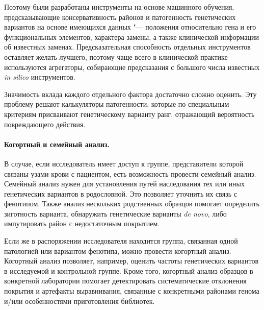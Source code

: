 \documentclass[a4paper,12pt]{article}
\begin{document}
\begin{enumerate}
Поэтому были разработаны инструменты на основе машинного обучения, предсказывающие консервативность районов и патогенность генетических вариантов на основе имеющихся данных "--- положения относительно гена и его функциональных элементов, характера замены, а также клинической информации об известных заменах\cite{j_Brea_Fernandez_2011}.
Предсказательная способность отдельных инструментов оставляет желать лучшего, поэтому чаще всего в клинической практике используются агрегаторы, собирающие предсказания с большого числа известных \textit{in silico} инструментов.
\end{enumerate}

Значимость вклада каждого отдельного фактора достаточно сложно оценить.
Эту проблему решают калькуляторы патогенности, которые по специальным критериям присваивают генетическому варианту ранг, отражающий вероятность повреждающего действия\cite{Ryzhkova_2017}.

\paragraph{Когортный и семейный анализ.}
В случае, если исследователь имеет доступ к группе, представители которой связаны узами крови с пациентом, есть возможность провести семейный анализ.
Семейный анализ нужен для установления путей наследования тех или иных генетических вариантов в родословной.
Это позволяет уточнить их связь с фенотипом.
Также анализ нескольких родственных образцов помогает определить зиготность варианта, обнаружить генетические варианты \textit{de novo}, либо импутировать район с недостаточным покрытием.
 
Если же в распоряжении исследователя находится группа, связанная одной патологией или вариантом фенотипа, можно провести когортный анализ.
Когортный анализ позволяет, например, оценить частоты генетических вариантов в исследуемой и контрольной группе.
Кроме того, когортный анализ образцов в конкретной лаборатории помогает детектировать систематические отклонения покрытия и артефакты выравнивания, связанные с конкретными районами генома и/или особенностями приготовления библиотек.

% 
% 
\end{document}
